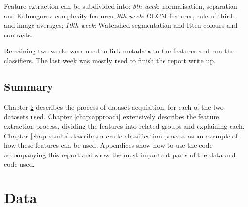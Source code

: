 \documentclass[11pt,a4paper,draft]{report}
\begin{document}
\begin{multicols}{2}
Feature extraction can be subdivided into: \emph{8th week}: normalisation,
separation and Kolmogorov complexity features;  \emph{9th week}: GLCM features,
rule of thirds and image averages; \emph{10th week}: Watershed segmentation and
Itten colours and contrasts.

Remaining two weeks were used to link metadata to the features and run the
classifiers.  The last week was mostly used to finish the report write up.

\section{Summary}

Chapter \ref{chap:data} describes the process of dataset acquisition, for each
of the two datasets used.  Chapter \ref{chap:approach} extensively describes
the feature extraction process, dividing the features into related groups and
explaining each.  Chapter \ref{chap:results} describes a crude classification
process as an example of how these features can be used.  Appendices show how
to use the code accompanying this report and show the most important parts of
the data and code used.

\end{multicols}

\chapter{Data}
\label{chap:data}
\end{document}
